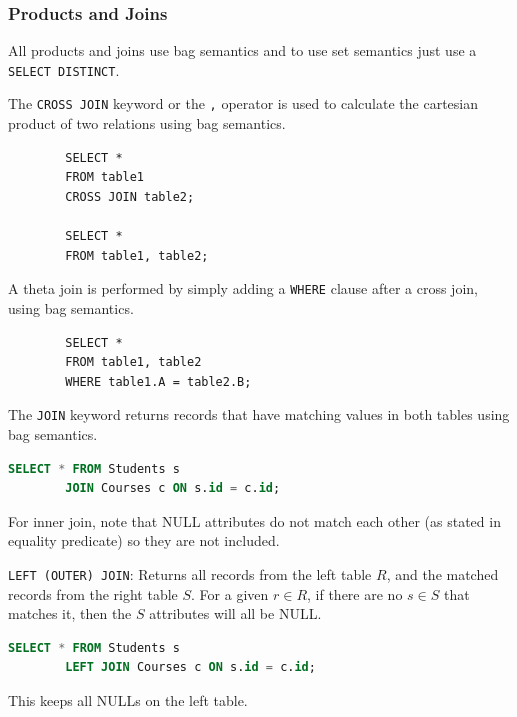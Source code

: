   \subsubsection{Products and Joins} 

    All products and joins use bag semantics and to use set semantics just use a \texttt{SELECT DISTINCT}. 

    \begin{definition}
      The \texttt{CROSS JOIN} keyword or the \texttt{,} operator is used to calculate the cartesian product of two relations using bag semantics. 
      \begin{lstlisting}
        SELECT *
        FROM table1
        CROSS JOIN table2; 

        SELECT *
        FROM table1, table2; 
      \end{lstlisting} 
    \end{definition}

    \begin{definition}
      A theta join is performed by simply adding a \texttt{WHERE} clause after a cross join, using bag semantics. 
      \begin{lstlisting}
        SELECT *
        FROM table1, table2 
        WHERE table1.A = table2.B;
      \end{lstlisting}
    \end{definition} 

    \begin{definition}
      The \texttt{JOIN} keyword returns records that have matching values in both tables using bag semantics. 
      \begin{lstlisting}[language=SQL]
        SELECT * FROM Students s
        JOIN Courses c ON s.id = c.id;
      \end{lstlisting}
      For inner join, note that NULL attributes do not match each other (as stated in equality predicate) so they are not included. 
    \end{definition}

    \begin{definition}
      \texttt{LEFT (OUTER) JOIN}: Returns all records from the left table $R$, and the matched records from the right table $S$. For a given $r \in R$, if there are no $s \in S$ that matches it, then the $S$ attributes will all be NULL. 
      \begin{lstlisting}[language=SQL]
        SELECT * FROM Students s
        LEFT JOIN Courses c ON s.id = c.id;
      \end{lstlisting} 
      This keeps all NULLs on the left table. 
    \end{definition}


